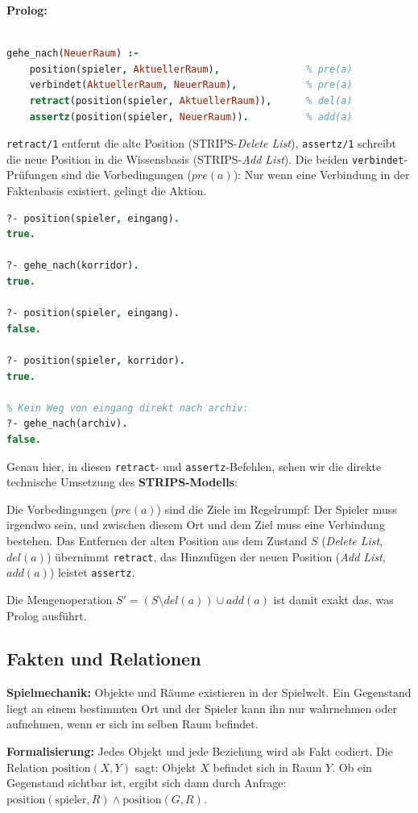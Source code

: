 \documentclass[parskip=half,a4paper,11pt]{scrreprt}
\begin{document}
\textbf{Prolog:}
\begin{lstlisting}[language=Prolog, caption={}]
% position/2 wurde bereits als :- dynamic deklariert

gehe_nach(NeuerRaum) :-
    position(spieler, AktuellerRaum),               % pre(a)
    verbindet(AktuellerRaum, NeuerRaum),            % pre(a)
    retract(position(spieler, AktuellerRaum)),      % del(a)
    assertz(position(spieler, NeuerRaum)).          % add(a)
\end{lstlisting}
\texttt{retract/1} entfernt die alte Position (STRIPS-\textit{Delete List}), \texttt{assertz/1} schreibt die neue Position in die Wissensbasis (STRIPS-\textit{Add List}). Die beiden \texttt{verbindet}-Prüfungen sind die Vorbedingungen ($pre(a)$): Nur wenn eine Verbindung in der Faktenbasis existiert, gelingt die Aktion.
\begin{lstlisting}[language=Prolog, caption={}]
?- position(spieler, eingang).
true.

?- gehe_nach(korridor).
true.

?- position(spieler, eingang).
false.

?- position(spieler, korridor).
true.

% Kein Weg von eingang direkt nach archiv:
?- gehe_nach(archiv).
false.
\end{lstlisting}
Genau hier, in diesen \texttt{retract}- und \texttt{assertz}-Befehlen, sehen wir die direkte technische Umsetzung des \textbf{STRIPS-Modells}:

Die Vorbedingungen ($pre(a)$) sind die Ziele im Regelrumpf: Der Spieler muss irgendwo sein, und zwischen diesem Ort und dem Ziel muss eine Verbindung bestehen. Das Entfernen der alten Position aus dem Zustand $S$ (\textit{Delete List}, $del(a)$) übernimmt \texttt{retract}, das Hinzufügen der neuen Position (\textit{Add List}, $add(a)$) leistet \texttt{assertz}. 

Die Mengenoperation $S' = (S \setminus del(a)) \cup add(a)$ ist damit exakt das, was Prolog ausführt.

\subsection{Fakten und Relationen}

\textbf{Spielmechanik:} Objekte und Räume existieren in der Spielwelt. Ein Gegenstand liegt an einem bestimmten Ort und der Spieler kann ihn nur wahrnehmen oder aufnehmen, wenn er sich im selben Raum befindet.

\textbf{Formalisierung:} Jedes Objekt und jede Beziehung wird als Fakt codiert. Die Relation $\text{position}(X, Y)$ sagt: Objekt $X$ befindet sich in Raum $Y$. Ob ein Gegenstand sichtbar ist, ergibt sich dann durch Anfrage: $\text{position}(\text{spieler}, R) \land \text{position}(G, R)$.
\end{document}
